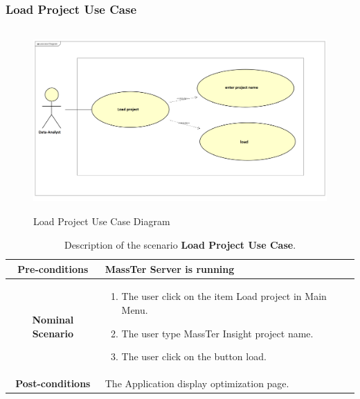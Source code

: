 	 \subsubsection{Load Project Use Case}
	 	\begin{figure}[h]
	\centering
	\includegraphics[width=14cm,height=7cm]{loadProject.png}
	\caption{Load Project Use Case Diagram}
	
	\end{figure}
 
  \begin{table}[!h]
  	\caption{Description of the scenario \textbf{Load Project Use Case}.}
  	\label{DSTabLP}
 	\centering
 	\begin{tabular}{|c|p{10cm}|}
 		\hline 	
 		\textbf{Pre-conditions } & MassTer Server is running \\ 
 		\hline                     
 		\textbf{Nominal Scenario } & \begin{enumerate}
 			\item The user click on the item Load project in Main Menu.
 			\item The user type MassTer Insight project name.
 			\item The user click on the button load. 
 		\end{enumerate} \\ 
 		\hline 
 		\textbf{Post-conditions} & The Application display optimization page. \\
 		\hline 
 	\end{tabular}
 \end{table}

